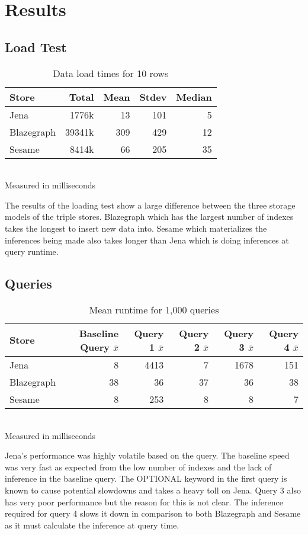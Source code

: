 \documentclass{llncs}
\begin{document}
\section{Results}
\subsection{Load Test}
\begin{table}
\begin{center}
\caption{Data load times for 10 rows}
\begin{tabular}{l | r r r r }
Store & Total & Mean & Stdev & Median \\
\hline
Jena & 1776k & 13 & 101 & 5 \\
Blazegraph & 39341k & 309 & 429 & 12 \\
Sesame & 8414k & 66 & 205 & 35
\end{tabular}
\\[5pt]
Measured in milliseconds
\end{center}
\end{table}
The results of the loading test show a large difference between the three storage models of the triple stores.  Blazegraph which has the largest number of indexes takes the longest to insert new data into.  Sesame which materializes the inferences being made also takes longer than Jena which is doing inferences at query runtime.

\subsection{Queries}
\begin{table}
\begin{center}
\caption{Mean runtime for 1,000 queries}
\begin{tabular}{l | r r r r r}
    Store & Baseline Query $\overline{x}$ & Query 1 $\overline{x}$ & Query 2 $\overline{x}$ & Query 3 $\overline{x}$ & Query 4 $\overline{x}$ \\
\hline
Jena & 8 & 4413 & 7 & 1678 & 151 \\
Blazegraph & 38 & 36 & 37 & 36 & 38 \\
Sesame & 8 & 253 & 8 & 8 & 7
\end{tabular}
\\[5pt]
Measured in milliseconds
\end{center}
\end{table}

Jena's performance was highly volatile based on the query.  The baseline speed was very fast as expected from the low number of indexes and the lack of inference in the baseline query.  The OPTIONAL keyword in the first query is known to cause potential slowdowns and takes a heavy toll on Jena.  Query 3 also has very poor performance but the reason for this is not clear.  The inference required for query 4 slows it down in comparison to both Blazegraph and Sesame as it must calculate the inference at query time.
\end{document}

